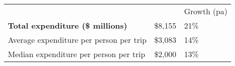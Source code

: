 \begin{tabular}[t]{p{4.85cm}>{\hfill}p{1.3cm}>{\hfill}p{1.35cm}}
    &   & Growth (pa) \\ 
 \textbf{Total expenditure (\$ millions)} & \$8,155 & 21\% \\ 
  Average expenditure per person per trip & \$3,083 & 14\% \\ 
  Median expenditure per person per trip & \$2,000 & 13\% \\ 
  \end{tabular}
